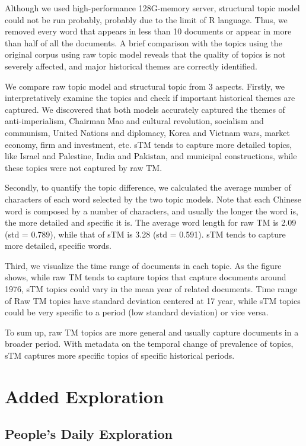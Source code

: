 \documentclass{article}
\begin{document}
Although we used high-performance 128G-memory server, structural topic model could not be run probably, probably due to the limit of R language. Thus, we removed every word that appears in less than 10 documents or appear in more than half of all the documents. A brief comparison with the topics using the original corpus using raw topic model reveals that the quality of topics is not severely affected, and major historical themes are correctly identified. 

We compare raw topic model and structural topic from 3 aspects. Firstly, we interpretatively examine the topics and check if important historical themes are captured. We discovered that both models accurately captured the themes of anti-imperialism, Chairman Mao and cultural revolution, socialism and communism, United Nations and diplomacy, Korea and Vietnam wars, market economy, firm and investment, etc. sTM tends to capture more detailed topics, like Israel and Palestine, India and Pakistan, and municipal constructions, while these topics were not captured by raw TM. 

Secondly, to quantify the topic difference, we calculated the average number of characters of each word selected by the two topic models. Note that each Chinese word is composed by a number of characters, and usually the longer the word is, the more detailed and specific it is. The average word length for raw TM is 2.09 (std = 0.789), while that of sTM is 3.28 (std = 0.591). sTM tends to capture more detailed, specific words. 

Third, we visualize the time range of documents in each topic. As the figure shows, while raw TM tends to capture topics that capture documents around 1976, sTM topics could vary in the mean year of related documents. Time range of Raw TM topics have standard deviation centered at 17 year, while sTM topics could be very specific to a period (low standard deviation) or vice versa. 

To sum up, raw TM topics are more general and usually capture documents in a broader period. With metadata on the temporal change of prevalence of topics, sTM captures more specific topics of specific historical periods.



\section{Added Exploration}

\subsection{People's Daily Exploration}
\end{document}
